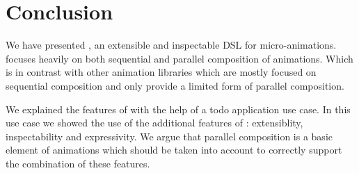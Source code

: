 \section{Conclusion}
\label{sec:conclusion}

We have presented \dsl{}, an extensible and inspectable DSL for micro-animations. \dsl{} focuses heavily on both sequential and parallel composition of animations. Which is in contrast with other animation libraries which are mostly focused on sequential composition and only provide a limited form of parallel composition.

We explained the features of \dsl{} with the help of a todo application use case. In this use case we showed the use of the additional features of \dsl{}: extensiblity, inspectability and expressivity. We argue that parallel composition is a basic element of animations which should be taken into account to correctly support the combination of these features.

